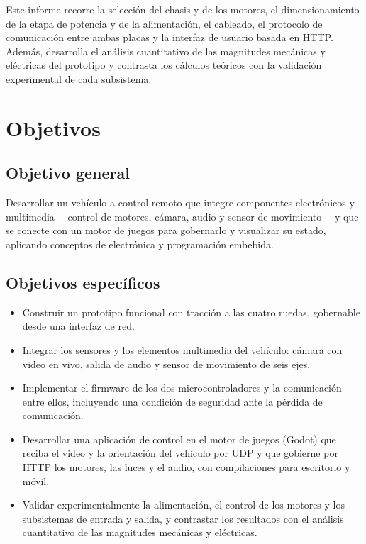 \documentclass[journal]{IEEEtran}
\begin{document}
Este informe recorre la selección del chasis y de los motores, el dimensionamiento de la etapa de potencia y de la alimentación, el cableado, el protocolo de comunicación entre ambas placas y la interfaz de usuario basada en HTTP. Además, desarrolla el análisis cuantitativo de las magnitudes mecánicas y eléctricas del prototipo y contrasta los cálculos teóricos con la validación experimental de cada subsistema.

\section{Objetivos}

\subsection{Objetivo general}
Desarrollar un vehículo a control remoto que integre componentes electrónicos y multimedia ---control de motores, cámara, audio y sensor de movimiento--- y que se conecte con un motor de juegos para gobernarlo y visualizar su estado, aplicando conceptos de electrónica y programación embebida.

\subsection{Objetivos específicos}
\begin{itemize}
    \item Construir un prototipo funcional con tracción a las cuatro ruedas, gobernable desde una interfaz de red.
    \item Integrar los sensores y los elementos multimedia del vehículo: cámara con video en vivo, salida de audio y sensor de movimiento de seis ejes.
    \item Implementar el firmware de los dos microcontroladores y la comunicación entre ellos, incluyendo una condición de seguridad ante la pérdida de comunicación.
    \item Desarrollar una aplicación de control en el motor de juegos (Godot) que reciba el video y la orientación del vehículo por UDP y que gobierne por HTTP los motores, las luces y el audio, con compilaciones para escritorio y móvil.
    \item Validar experimentalmente la alimentación, el control de los motores y los subsistemas de entrada y salida, y contrastar los resultados con el análisis cuantitativo de las magnitudes mecánicas y eléctricas.
\end{itemize}
\end{document}
